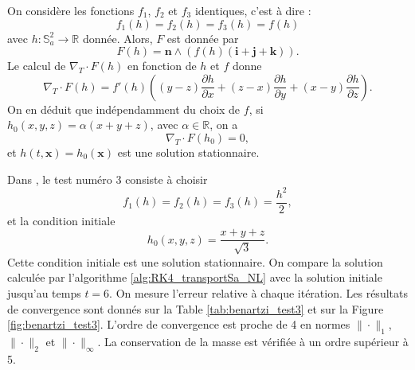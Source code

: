 On considère les fonctions $f_1$, $f_2$ et $f_3$ identiques, c'est à dire :
\begin{equation}
f_1(h) = f_2(h) = f_3(h) = f(h)
\end{equation}
avec $h : \mathbb{S}_a^2 \rightarrow \mathbb{R}$ donnée.
Alors, $F$ est donnée par
\begin{equation}
F(h) = \mathbf{n} \wedge \left( f(h) (\mathbf{i}+\mathbf{j}+\mathbf{k}) \right).
\end{equation}
Le calcul de $\nabla_T \cdot F(h)$ en fonction de $h$ et $f$ donne
\begin{equation}
\nabla_T \cdot F(h) = f'(h) \left( (y-z)\dfrac{\partial h}{\partial x} + (z-x)\dfrac{\partial h}{\partial y} + (x-y)\dfrac{\partial h}{\partial z} \right).
\end{equation}
On en déduit que indépendamment du choix de $f$, si $h_0(x,y,z) = \alpha (x+y+z)$, avec $\alpha \in \mathbb{R}$, on a
\begin{equation}
\nabla_T \cdot F(h_0) = 0,
\end{equation}
et $h(t,\mathbf{x}) = h_0(\mathbf{x})$ est une solution stationnaire.

Dans \cite{BenArtzi2009}, le test numéro 3 consiste à choisir
\begin{equation}
f_1(h) = f_2(h) = f_3(h) = \dfrac{h^2}{2},
\end{equation}
et la condition initiale 
\begin{equation}
h_0(x,y,z) = \dfrac{x+y+z}{\sqrt{3}}.
\end{equation}
Cette condition initiale est une solution stationnaire. On compare la solution calculée par l'algorithme \ref{alg:RK4_transportSa_NL} avec la solution initiale jusqu'au temps $t=6$. On mesure l'erreur relative à chaque itération. Les résultats de convergence sont donnés sur la Table \ref{tab:benartzi_test3} et sur la Figure \ref{fig:benartzi_test3}. L'ordre de convergence est proche de 4 en normes $\| \cdot \|_1$, $\| \cdot \|_2$ et $\| \cdot \|_{\infty}$. La conservation de la masse est vérifiée à un ordre supérieur à 5.

